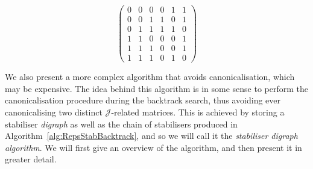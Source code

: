 \documentclass[11pt]{article}
\numberwithin{equation}{section}
\newcommand{\J}{\mathscr{J}}
\begin{document}
\[ 
  \begin{pmatrix}
    0 & 0 & 0 & 0 & 1 & 1 \\
    0 & 0 & 1 & 1 & 0 & 1 \\
    0 & 1 & 1 & 1 & 1 & 0 \\
    1 & 1 & 0 & 0 & 0 & 1 \\
    1 & 1 & 1 & 0 & 0 & 1 \\
    1 & 1 & 1 & 0 & 1 & 0
  \end{pmatrix}
\]

We also present a more complex algorithm that avoids canonicalisation, which may
be expensive. The idea behind this algorithm is in some sense to perform the
canonicalisation procedure during the backtrack search, thus avoiding ever
canonicalising two distinct $\J$-related matrices. This is achieved by storing a
stabiliser \emph{digraph} as well as the chain of stabilisers produced in
Algorithm~\ref{alg:RepsStabBacktrack}, and so we will call it the
\emph{stabiliser digraph algorithm}. We will first give an overview of the
algorithm, and then present it in greater detail.\\
\end{document}
